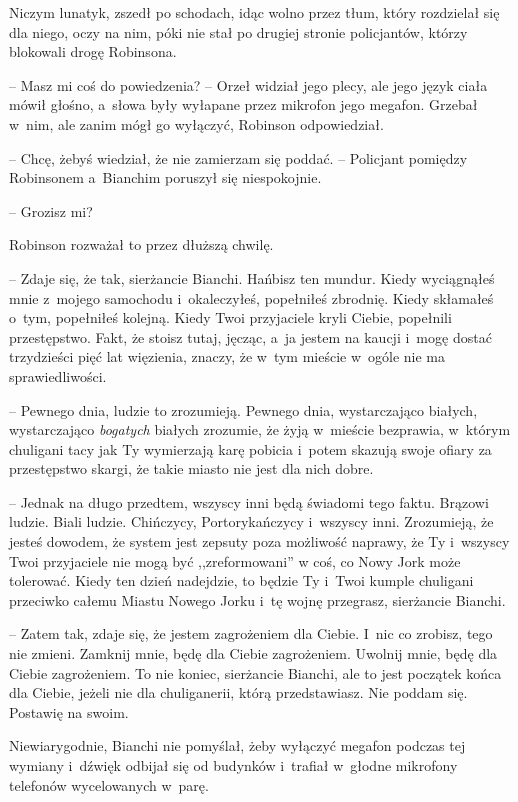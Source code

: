 \documentclass[oneside,polish,11pt,sfheadings]{mwbk}
\begin{document}
Niczym lunatyk, zszedł po schodach, idąc wolno przez tłum, który
rozdzielał się dla niego, oczy na nim, póki nie stał po drugiej stronie
policjantów, którzy blokowali drogę Robinsona.

-- Masz mi coś do powiedzenia? -- Orzeł widział jego plecy, ale jego język
ciała mówił głośno, a~słowa były wyłapane przez mikrofon jego megafon.
Grzebał w~nim, ale zanim mógł go wyłączyć, Robinson odpowiedział.

-- Chcę, żebyś wiedział, że nie zamierzam się poddać. -- Policjant
pomiędzy Robinsonem a~Bianchim poruszył się niespokojnie.

-- Grozisz mi?

Robinson rozważał to przez dłuższą chwilę. 

-- Zdaje się, że tak,
sierżancie Bianchi. Hańbisz ten mundur. Kiedy wyciągnąłeś mnie z~mojego
samochodu i~okaleczyłeś, popełniłeś zbrodnię. Kiedy skłamałeś o~tym,
popełniłeś kolejną. Kiedy Twoi przyjaciele kryli Ciebie, popełnili
przestępstwo. Fakt, że stoisz tutaj, jęcząc, a~ja jestem na kaucji i~mogę dostać trzydzieści pięć lat więzienia, znaczy, że w~tym mieście w~ogóle nie ma sprawiedliwości.

-- Pewnego dnia, ludzie to zrozumieją. Pewnego dnia, wystarczająco
białych, wystarczająco \textit{bogatych} białych zrozumie, że żyją w~mieście bezprawia, w~którym chuligani tacy jak Ty wymierzają karę
pobicia i~potem skazują swoje ofiary za przestępstwo skargi, że takie
miasto nie jest dla nich dobre.

-- Jednak na długo przedtem, wszyscy inni będą świadomi tego faktu.
Brązowi ludzie. Biali ludzie. Chińczycy, Portorykańczycy i~wszyscy inni.
Zrozumieją, że jesteś dowodem, że system jest zepsuty poza możliwość
naprawy, że Ty i~wszyscy Twoi przyjaciele nie mogą być ,,zreformowani''
w coś, co Nowy Jork może tolerować. Kiedy ten dzień nadejdzie, to będzie
Ty i~Twoi kumple chuligani przeciwko całemu Miastu Nowego Jorku i~tę
wojnę przegrasz, sierżancie Bianchi.

-- Zatem tak, zdaje się, że jestem zagrożeniem dla Ciebie. I~nic co
zrobisz, tego nie zmieni. Zamknij mnie, będę dla Ciebie zagrożeniem.
Uwolnij mnie, będę dla Ciebie zagrożeniem. To nie koniec, sierżancie
Bianchi, ale to jest początek końca dla Ciebie, jeżeli nie dla
chuliganerii, którą przedstawiasz. Nie poddam się. Postawię na swoim.

Niewiarygodnie, Bianchi nie pomyślał, żeby wyłączyć megafon podczas tej
wymiany i~dźwięk odbijał się od budynków i~trafiał w~głodne mikrofony
telefonów wycelowanych w~parę.
\end{document}

